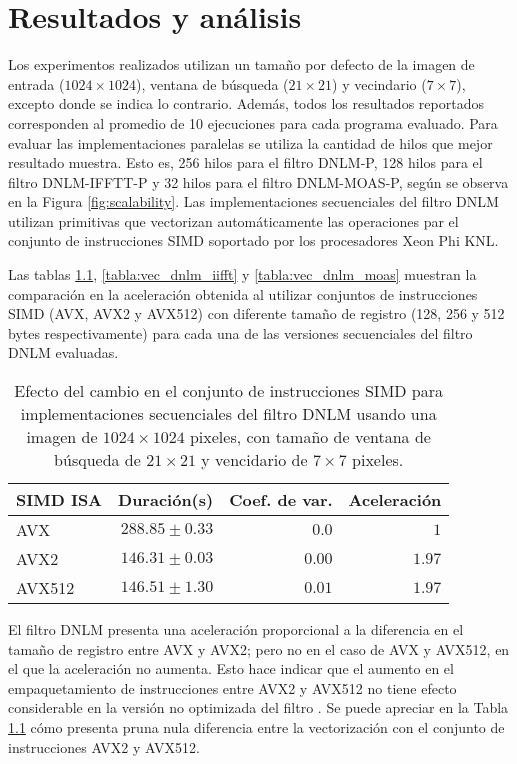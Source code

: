 \chapter{Resultados y análisis}
\label{ch:res}

Los experimentos realizados utilizan un tama\~no por defecto de la imagen de entrada ($1024 \times 1024$), ventana de b\'usqueda \Omega  ($21\times21$) y vecindario \omega ($7\times7$), excepto donde se indica lo contrario. Adem\'as, todos los resultados reportados corresponden al promedio de 10 ejecuciones para cada programa evaluado.  Para evaluar las implementaciones paralelas se utiliza la cantidad de hilos que mejor resultado muestra. Esto es, 256 hilos para el filtro DNLM-P, 128 hilos para el filtro DNLM-IFFTT-P y 32 hilos para el filtro DNLM-MOAS-P, seg\'un se observa en la Figura \ref{fig:scalability}. Las implementaciones secuenciales del filtro DNLM utilizan primitivas que vectorizan autom\'aticamente las operaciones par el conjunto de instrucciones SIMD soportado por los procesadores Xeon Phi KNL.

Las tablas \ref{tabla:vec_dnlm}, \ref{tabla:vec_dnlm_iifft} y \ref{tabla:vec_dnlm_moas} muestran la comparaci\'on en la aceleraci\'on obtenida al utilizar conjuntos de instrucciones SIMD (AVX, AVX2 y AVX512) con diferente tama\~no de registro (128, 256 y 512 bytes respectivamente) para cada una de las versiones secuenciales del filtro DNLM evaluadas. 


\begin{table}
\protect\caption{Efecto del cambio en el conjunto de instrucciones SIMD para implementaciones secuenciales del filtro DNLM usando una imagen de  $1024 \times 1024$ pixeles, con tama\~no de ventana de b\'usqueda de $21 \times 21$ y vencidario de $7 \times 7$ pixeles. \label{tabla:vec_dnlm}}
\centering
\begin{tabular}{lrrr}
SIMD ISA & Duraci\'on(s)& Coef. de var. & Aceleraci\'on \tabularnewline
\hline
AVX & $288.85\pm0.33$ & $0.0$ & $1$\tabularnewline
AVX2 & $146.31\pm0.03$ & $0.00$ & $1.97$\tabularnewline
AVX512 & $146.51\pm 1.30$ & $0.01$ & $1.97$ \tabularnewline
\end{tabular}
\end{table}

El filtro DNLM presenta una aceleraci\'on proporcional a la diferencia en el tama\~no de registro entre AVX y AVX2; pero no en el caso de AVX y AVX512, en el que la aceleraci\'on no aumenta. Esto hace indicar que el aumento en el empaquetamiento de instrucciones entre AVX2 y AVX512 no tiene efecto considerable en la versi\'on no optimizada del filtro . Se puede apreciar en la Tabla \ref{tabla:vec_dnlm} c\'omo presenta pr\acticamente una nula diferencia entre la vectorizaci\'on con el conjunto de instrucciones AVX2 y AVX512. 


